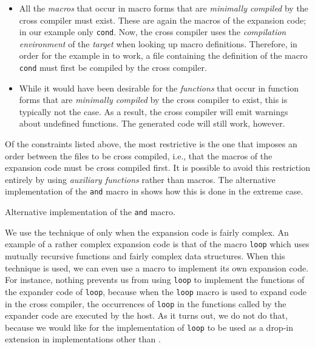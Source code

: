 \begin{itemize}
\item All the \emph{macros} that occur in macro forms that are
  \emph{minimally compiled} by the cross compiler must exist.  These
  are again the macros of the expansion code; in our example only
  \texttt{cond}.  Now, the cross compiler uses the \emph{compilation
    environment} of the \emph{target} when looking up macro
  definitions.  Therefore, in order for the example in
   to work, a file containing the
  definition of the macro \texttt{cond} must first be compiled by the
  cross compiler. 
\item While it would have been desirable for the \emph{functions} that
  occur in function forms that are \emph{minimally compiled} by the
  cross compiler to exist, this is typically not the case.%
  As a
  result, the cross compiler will emit warnings about undefined
  functions.  The generated code will still work, however.
\end{itemize}

Of the constraints listed above, the most restrictive is the one that
imposes an order between the files to be cross compiled, i.e., that
the macros of the expansion code must be cross compiled first.  It is
possible to avoid this restriction entirely by using \emph{auxiliary
  functions} rather than macros.  The alternative implementation of
the \texttt{and} macro in  shows how this
is done in the extreme case.

\begin{codefragment}
\caption{\label{code-defmacro-and-2}
Alternative implementation of the \texttt{and} macro.}
\end{codefragment}

We use the technique of  only when the
expansion code is fairly complex.  An example of a rather complex
expansion code is that of the macro \texttt{loop} which uses mutually
recursive functions and fairly complex data structures.  When this
technique is used, we can even use a macro to implement its own
expansion code.  For instance, nothing prevents us from using
\texttt{loop} to implement the functions of the expander code of
\texttt{loop}, because when the \texttt{loop} macro is used to expand
code in the cross compiler, the occurrences of \texttt{loop} in the
functions called by the expander code are executed by the host.  As it
turns out, we do not do that, because we would like for the \sysname{}
implementation of \texttt{loop} to be used as a drop-in extension in
implementations other than \sysname{}.



